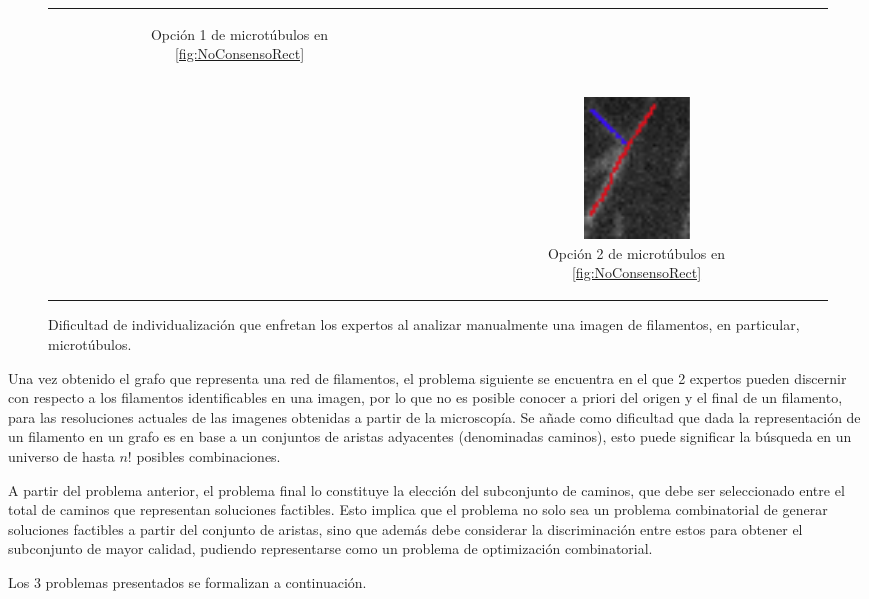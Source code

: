 \begin{figure}[h]
\begin{tabular}{c c c}
\begin{subfigure}[t]{0.21\textwidth}
        \caption{Opci\'on 1 de microt\'ubulos en \ref{fig:NoConsensoRect}}
        \label{fig:NoConsensoOpcion1}
        \end{subfigure} \\
        & &
        \begin{subfigure}[b]{0.21\textwidth}
        \includegraphics[scale=0.8]{imagenes/NoConsenso4.png}
        \caption{Opci\'on 2 de microt\'ubulos en \ref{fig:NoConsensoRect}}
        \label{fig:NoConsensoOpcion2}
        \end{subfigure} \\
    \end{tabular}{}
    
    \caption{Dificultad de individualizaci\'on que enfretan los expertos al analizar manualmente una imagen de filamentos, en particular, microt\'ubulos.}
\end{figure}


Una vez obtenido el grafo que representa una red de filamentos, el problema siguiente se encuentra en el que 2 expertos pueden discernir con respecto a los filamentos identificables en una imagen, por lo que no es posible conocer a priori del origen y el final de un filamento, para las resoluciones actuales de las imagenes obtenidas a partir de la microscop\'ia. Se añade como dificultad que dada la representaci\'on de un filamento en un grafo es en base a un conjuntos de aristas adyacentes (denominadas caminos), esto puede significar la b\'usqueda en un universo de hasta $n!$ posibles combinaciones.

A partir del problema anterior, el problema final lo constituye la elecci\'on del subconjunto de caminos, que debe ser seleccionado entre el total de caminos que representan soluciones factibles. Esto implica que el problema no solo sea un problema combinatorial de generar soluciones factibles a partir del conjunto de aristas, sino que adem\'as debe considerar la discriminaci\'on entre estos para obtener el subconjunto de mayor calidad, pudiendo representarse como un problema de optimizaci\'on combinatorial.

Los 3 problemas presentados se formalizan a continuaci\'on.

